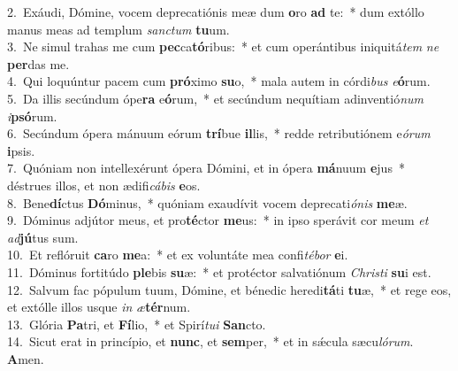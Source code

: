 {2.~}Exáudi, Dómine, vocem deprecatiónis meæ dum \textbf{o}ro \textbf{ad} te:~* dum extóllo manus meas ad templum \textit{san}\textit{ctum} \textbf{tu}um.\\
{3.~}Ne simul trahas me cum \textbf{pec}ca\textbf{tó}ribus:~* et cum operántibus iniquitá\textit{tem} \textit{ne} \textbf{per}das me.\\
{4.~}Qui loquúntur pacem cum \textbf{pró}ximo \textbf{su}o,~* mala autem in córdi\textit{bus} \textit{e}\textbf{ó}rum.\\
{5.~}Da illis secúndum ópe\textbf{ra} e\textbf{ó}rum,~* et secúndum nequítiam adinventió\textit{num} \textit{i}\textbf{psó}rum.\\
{6.~}Secúndum ópera mánuum eórum \textbf{trí}bue \textbf{il}lis,~* redde retributiónem e\textit{ó}\textit{rum} \textbf{i}psis.\\
{7.~}Quóniam non intellexérunt ópera Dómini, et in ópera \textbf{má}nuum \textbf{e}jus~* déstrues illos, et non ædifi\textit{cá}\textit{bis} \textbf{e}os.\\
{8.~}Bene\textbf{dí}ctus \textbf{Dó}minus,~* quóniam exaudívit vocem deprecati\textit{ó}\textit{nis} \textbf{me}æ.\\
{9.~}Dóminus adjútor meus, et pro\textbf{té}ctor \textbf{me}us:~* in ipso sperávit cor meum \textit{et} \textit{ad}\textbf{jú}tus sum.\\
{10.~}Et reflóruit \textbf{ca}ro \textbf{me}a:~* et ex voluntáte mea confi\textit{té}\textit{bor} \textbf{e}i.\\
{11.~}Dóminus fortitúdo \textbf{ple}bis \textbf{su}æ:~* et protéctor salvatiónum \textit{Chri}\textit{sti} \textbf{su}i est.\\
{12.~}Salvum fac pópulum tuum, Dómine, et bénedic heredi\textbf{tá}ti \textbf{tu}æ,~* et rege eos, et extólle illos usque \textit{in} \textit{æ}\textbf{tér}num.\\
{13.~}Glória \textbf{Pa}tri, et \textbf{Fí}lio,~* et Spirí\textit{tu}\textit{i} \textbf{San}cto.\\
{14.~}Sicut erat in princípio, et \textbf{nunc}, et \textbf{sem}per,~* et in sǽcula sæcu\textit{ló}\textit{rum}. \textbf{A}men.\\

